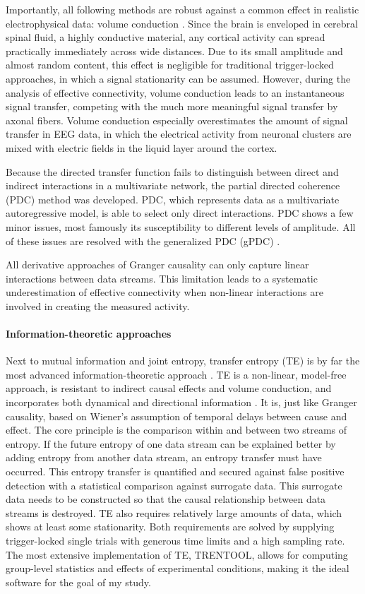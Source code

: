 Importantly, all following methods are robust against a common effect in realistic electrophysical data: volume conduction \cite{1.5.PDC}.
Since the brain is enveloped in cerebral spinal fluid, a highly conductive material, any cortical activity can spread practically immediately across wide distances.
Due to its small amplitude and almost random content, this effect is negligible for traditional trigger-locked approaches, in which a signal stationarity can be assumed.
However, during the analysis of effective connectivity, volume conduction leads to an instantaneous signal transfer, competing with the much more meaningful signal transfer by axonal fibers.
Volume conduction especially overestimates the amount of signal transfer in EEG data, in which the electrical activity from neuronal clusters are mixed with electric fields in the liquid layer around the cortex.

Because the directed transfer function fails to distinguish between direct and indirect interactions in a multivariate network, the partial directed coherence (PDC) method was developed.
PDC, which represents data as a multivariate autoregressive model, is able to select only direct interactions.
PDC shows a few minor issues, most famously its susceptibility to different levels of amplitude.
All of these issues are resolved with the generalized PDC (gPDC) \cite{1.5.gPDC}.

All derivative approaches of Granger causality can only capture linear interactions between data streams.
This limitation leads to a systematic underestimation of effective connectivity when non-linear interactions are involved in creating the measured activity.

\paragraph{Information-theoretic approaches}
Next to mutual information and joint entropy, transfer entropy (TE) is by far the most advanced information-theoretic approach \cite{1.5.TEcomparison}.
TE is a non-linear, model-free approach, is resistant to indirect causal effects and volume conduction, and incorporates both dynamical and directional information \cite{3.4.TE}.
It is, just like Granger causality, based on Wiener's assumption of temporal delays between cause and effect.
The core principle is the comparison within and between two streams of entropy.
If the future entropy of one data stream can be explained better by adding entropy from another data stream, an entropy transfer must have occurred.
This entropy transfer is quantified and secured against false positive detection with a statistical comparison against surrogate data.
This surrogate data needs to be constructed so that the causal relationship between data streams is destroyed.
TE also requires relatively large amounts of data, which shows at least some stationarity.
Both requirements are solved by supplying trigger-locked single trials with generous time limits and a high sampling rate.
The most extensive implementation of TE, TRENTOOL, allows for computing group-level statistics and effects of experimental conditions, making it the ideal software for the goal of my study.
